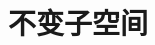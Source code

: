
\section{不变子空间}







\section{}







\section{}







\section{}







\section{}







\section{}







\section{}







\section{}






